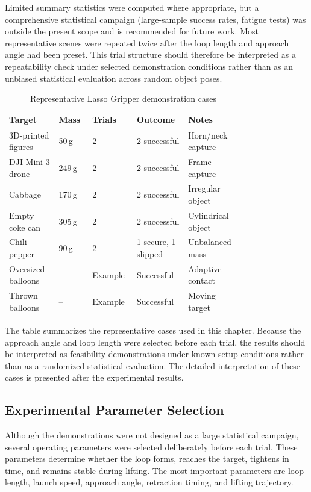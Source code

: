 Limited summary statistics were computed where appropriate, but a comprehensive statistical campaign (large-sample success rates, fatigue tests) was outside the present scope and is recommended for future work. Most representative scenes were repeated twice after the loop length and approach angle had been preset. This trial structure should therefore be interpreted as a repeatability check under selected demonstration conditions rather than as an unbiased statistical evaluation across random object poses.

\begin{table}[htbp]
    \centering
    \caption{Representative Lasso Gripper demonstration cases}
    \label{tab:lasso_demo_cases}
    \begin{tabular}{p{0.18\linewidth} p{0.12\linewidth} p{0.12\linewidth} p{0.16\linewidth} p{0.20\linewidth}}
        \toprule
        Target & Mass & Trials & Outcome & Notes \\
        \midrule
        3D-printed figures & 50\,g & 2 & 2 successful & Horn/neck capture \\
        DJI Mini 3 drone & 249\,g & 2 & 2 successful & Frame capture \\
        Cabbage & 170\,g & 2 & 2 successful & Irregular object \\
        Empty coke can & 305\,g & 2 & 2 successful & Cylindrical object \\
        Chili pepper & 90\,g & 2 & 1 secure, 1 slipped & Unbalanced mass \\
        Oversized balloons & -- & Example & Successful & Adaptive contact \\
        Thrown balloons & -- & Example & Successful & Moving target \\
        \bottomrule
    \end{tabular}
\end{table}

The table summarizes the representative cases used in this chapter. Because the approach angle and loop length were selected before each trial, the results should be interpreted as feasibility demonstrations under known setup conditions rather than as a randomized statistical evaluation. The detailed interpretation of these cases is presented after the experimental results.

\subsection{Experimental Parameter Selection}
Although the demonstrations were not designed as a large statistical campaign, several operating parameters were selected deliberately before each trial. These parameters determine whether the loop forms, reaches the target, tightens in time, and remains stable during lifting. The most important parameters are loop length, launch speed, approach angle, retraction timing, and lifting trajectory.

